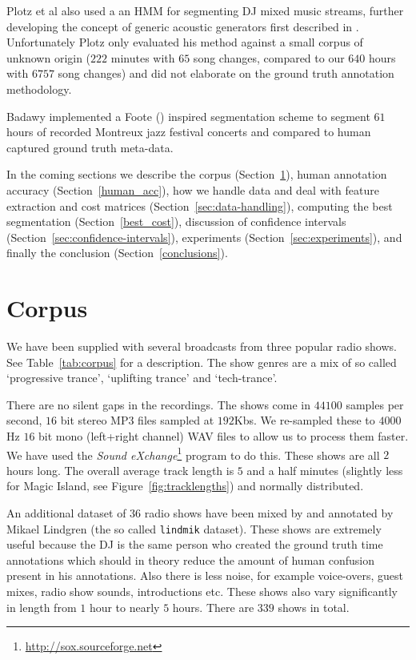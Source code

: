 \documentclass[twocolumn]{article}
\begin{document}
	Plotz et al also used a an HMM for segmenting DJ mixed music streams, further developing the concept of generic acoustic generators first described in \citep{batlle2002automatic}. Unfortunately Plotz only evaluated his method against a small corpus of unknown origin ($222$ minutes with $65$ song changes, compared to our $640$ hours with $6757$ song changes) and did not elaborate on the ground truth annotation methodology. 
	
	Badawy implemented a Foote (\citep{foote2003media}) inspired segmentation scheme to segment $61$ hours of recorded Montreux jazz festival concerts and compared to human captured ground truth meta-data. 
	
	In the coming sections we describe the corpus (Section~\ref{dataset}), human annotation accuracy (Section~\ref{human_acc}), how we handle data and deal with feature extraction and cost matrices (Section~\ref{sec:data-handling}), computing the best segmentation (Section~\ref{best_cost}), discussion of confidence intervals (Section~\ref{sec:confidence-intervals}), experiments (Section~\ref{sec:experiments}), and finally the conclusion (Section~\ref{conclusions}).
	
	\section{Corpus}\label{dataset}
	
	We have been supplied with several broadcasts from three popular radio shows. See Table~\ref{tab:corpus} for a description. The show genres are a mix of so called `progressive trance', `uplifting trance' and `tech-trance'. 
	
	There are no silent gaps in the recordings. The shows come in $44100$ samples per second, $16$ bit stereo MP3 files sampled at $192$Kbs. We re-sampled these to $4000$Hz $16$ bit mono (left+right channel) WAV files to allow us to process them faster. We have used the \textit{Sound eXchange}\footnote{\url{http://sox.sourceforge.net}} program to do this. These shows are all $2$ hours long. The overall average track length is $5$ and a half minutes (slightly less for Magic Island, see Figure~\ref{fig:tracklengths}) and normally distributed.
	
	An additional dataset of $36$ radio shows have been mixed by and annotated by Mikael Lindgren (the so called \texttt{lindmik} dataset). These shows are extremely useful because the DJ is the same person who created the ground truth time annotations which should in theory reduce the amount of human confusion present in his annotations. Also there is less noise, for example voice-overs, guest mixes, radio show sounds, introductions etc. These shows also vary significantly in length from $1$ hour to nearly $5$ hours. There are $339$ shows in total.
	
\end{document}
